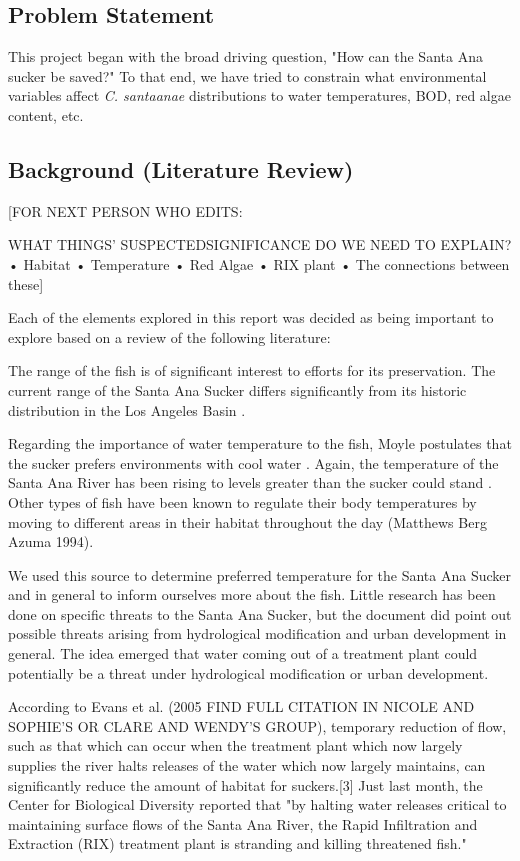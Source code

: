 \documentclass{article}\usepackage[]{graphicx}\usepackage[]{color}
\begin{document}
\subsection{Problem Statement}

This project began with the broad driving question, "How can the Santa Ana sucker be saved?" To that end, we have tried to constrain what environmental variables affect \emph{C. santaanae} distributions to water temperatures, BOD, red algae content, etc. 

\subsection{Background (Literature Review)}

[FOR NEXT PERSON WHO EDITS: 

WHAT THINGS' SUSPECTEDSIGNIFICANCE DO WE NEED TO EXPLAIN? 
•	Habitat 
•	Temperature 
•	Red Algae
•	RIX plant
•	The connections between these]


Each of the elements explored in this report was decided as being important to explore based on a review of the following literature:

The range of the fish is of significant interest to efforts for its preservation. The current range of the Santa Ana Sucker differs significantly from its historic distribution in the Los Angeles Basin \citep{brown2005aquatic, saiki2007life}.

Regarding the importance of water temperature to the fish, Moyle postulates that the sucker prefers environments with cool water \citep{moyle2002inland}. Again, the temperature of the Santa Ana River has been rising to levels greater than the sucker could stand \citep{REF}. Other types of fish have been known to regulate their body temperatures by moving to different areas in their habitat throughout the day (Matthews Berg Azuma 1994).

We used this source to determine preferred temperature for the Santa Ana Sucker and in general to inform ourselves more about the fish. Little research has been done on specific threats to the Santa Ana Sucker, but the document did point out possible threats arising from hydrological modification and urban development in general. The idea emerged that water coming out of a treatment plant could potentially be a threat under hydrological modification or urban development.


According to Evans et al. (2005 FIND FULL CITATION IN NICOLE AND SOPHIE'S OR CLARE AND WENDY'S GROUP), temporary reduction of flow, such as that which can occur when the treatment plant which now largely supplies the river halts releases of the water which now largely maintains, can significantly reduce the amount of habitat for suckers.[3] Just last month, the Center for Biological Diversity reported that "by halting water releases critical to maintaining surface flows of the Santa Ana River, the Rapid Infiltration and Extraction (RIX) treatment plant is stranding and killing threatened fish." 
\end{document}
